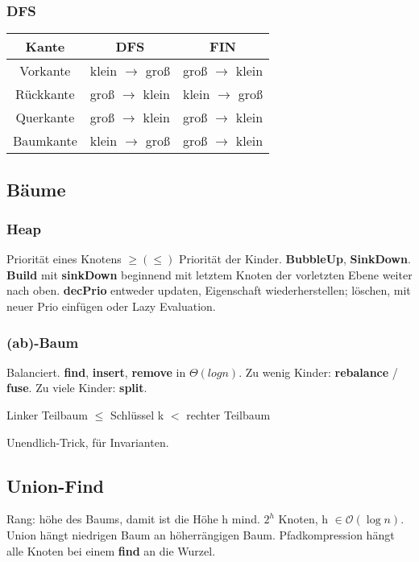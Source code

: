 \documentclass[11pt, a4paper, twoside]{article}
\begin{document}
\begin{multicols}{2}
\end{multicols}

\newpage

\begin{multicols}{2}

    \subsubsection{DFS}

    \begin{tabular}{c || c | c}
        Kante & DFS & FIN \\
        \hline
        Vorkante & klein $\rightarrow$ groß & groß $\rightarrow$ klein \\
        Rückkante & groß $\rightarrow$ klein & klein $\rightarrow$ groß \\
        Querkante & groß $\rightarrow$ klein & groß $\rightarrow$ klein \\
        Baumkante & klein $\rightarrow$ groß & groß $\rightarrow$ klein \\
    \end{tabular}
    \subsection{Bäume}
    \subsubsection{Heap}
    Priorität eines Knotens $\geq (\leq)$ Priorität der Kinder.
    \textbf{BubbleUp}, \textbf{SinkDown}. \textbf{Build} mit \textbf{sinkDown} 
    beginnend mit letztem Knoten der vorletzten Ebene weiter nach oben.
    \textbf{decPrio} entweder updaten, Eigenschaft wiederherstellen; löschen,
    mit neuer Prio einfügen oder Lazy Evaluation.

    \subsubsection{(ab)-Baum}
    Balanciert. \textbf{find}, \textbf{insert}, \textbf{remove} in 
    $\Theta(log n)$. Zu wenig Kinder: \textbf{rebalance} / \textbf{fuse}. 
    Zu viele Kinder: \textbf{split}. 

    Linker Teilbaum $\leq$ Schlüssel k $<$ rechter Teilbaum

    Unendlich-Trick, für Invarianten.  

    \subsection{Union-Find}
    Rang: höhe des Baums, damit ist die Höhe h mind. $2^h$ Knoten, h $\in
    \mathcal{O}(\log n)$. 
    Union hängt niedrigen Baum an höherrängigen Baum. Pfadkompression hängt alle
    Knoten bei einem \textbf{find} an die Wurzel. 



\end{multicols}
\end{document}
